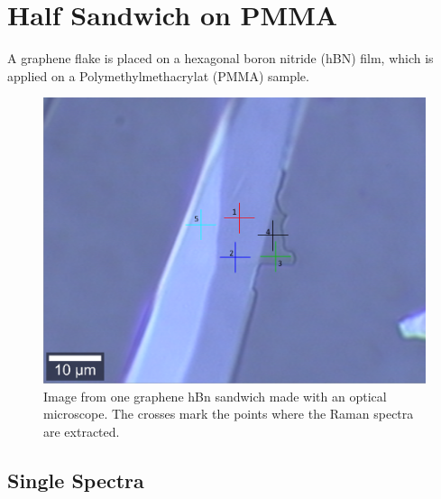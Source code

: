 \documentclass[12pt,a4paper]{article}
\begin{document}
\section{Half Sandwich on PMMA}
\label{sec:5}
A graphene flake is placed on a hexagonal boron nitride (hBN) film, which is applied on a Polymethylmethacrylat (PMMA) sample. 

\begin{figure}[h]
\centering
\includegraphics[scale=0.4]{Bilder/Part_2/4_Half_sandwich_on_PMMA.PNG}
\caption{Image from one graphene hBn sandwich made with an optical microscope. The crosses mark the points where the Raman spectra are extracted.}
\label{fig:Part2_map_microscope}
\end{figure}

\subsection{Single Spectra}
\end{document}

